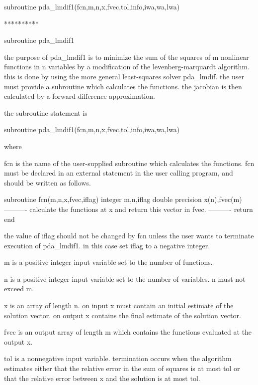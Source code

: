 \documentclass[11pt,twoside,nolof]{starlink}
\begin{document}
\begin{terminalv}
      subroutine pda_lmdif1(fcn,m,n,x,fvec,tol,info,iwa,wa,lwa)


     **********

     subroutine pda_lmdif1

     the purpose of pda_lmdif1 is to minimize the sum of the squares of
     m nonlinear functions in n variables by a modification of the
     levenberg-marquardt algorithm. this is done by using the more
     general least-squares solver pda_lmdif. the user must provide a
     subroutine which calculates the functions. the jacobian is
     then calculated by a forward-difference approximation.

     the subroutine statement is

       subroutine pda_lmdif1(fcn,m,n,x,fvec,tol,info,iwa,wa,lwa)

     where

       fcn is the name of the user-supplied subroutine which
         calculates the functions. fcn must be declared
         in an external statement in the user calling
         program, and should be written as follows.

         subroutine fcn(m,n,x,fvec,iflag)
         integer m,n,iflag
         double precision x(n),fvec(m)
         ----------
         calculate the functions at x and
         return this vector in fvec.
         ----------
         return
         end

         the value of iflag should not be changed by fcn unless
         the user wants to terminate execution of pda_lmdif1.
         in this case set iflag to a negative integer.

       m is a positive integer input variable set to the number
         of functions.

       n is a positive integer input variable set to the number
         of variables. n must not exceed m.

       x is an array of length n. on input x must contain
         an initial estimate of the solution vector. on output x
         contains the final estimate of the solution vector.

       fvec is an output array of length m which contains
         the functions evaluated at the output x.

       tol is a nonnegative input variable. termination occurs
         when the algorithm estimates either that the relative
         error in the sum of squares is at most tol or that
         the relative error between x and the solution is at
         most tol.


\end{terminalv}
\end{document}
